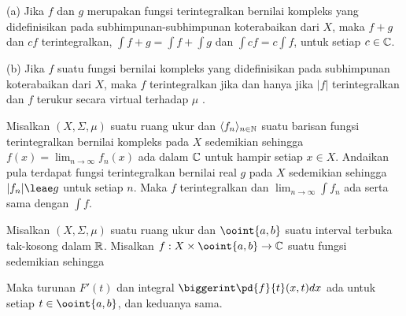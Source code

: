 (a) Jika $f$ dan $g$ merupakan fungsi terintegralkan bernilai kompleks yang
didefinisikan pada subhimpunan-subhimpunan koterabaikan dari $X$, maka $f+g$
dan $cf$ terintegralkan, $\int f+g=\int f+\int g$ dan
$\int cf=c\int f$, untuk setiap $c\in\Bbb C$.

{(b)} Jika $f$ suatu fungsi bernilai kompleks yang didefinisikan pada
subhimpunan koterabaikan dari $X$, maka $f$ terintegralkan jika dan hanya jika
$|f|$ terintegralkan dan $f$ terukur secara virtual terhadap $\mu$
.


 Misalkan
$(X,\Sigma,\mu)$ suatu ruang ukur dan $\langle f_n\rangle_{n\in\Bbb N}$ suatu
barisan fungsi terintegralkan bernilai kompleks pada $X$ sedemikian sehingga
$f(x)=\lim_{n\to\infty}f_n(x)$ ada dalam $\Bbb C$ untuk hampir setiap
$x\in X$. Andaikan pula terdapat fungsi terintegralkan bernilai real $g$
pada $X$ sedemikian sehingga $|f_n|\leae g$ untuk setiap $n$. Maka $f$
terintegralkan dan $\lim_{n\to\infty}\int f_n$ ada serta sama dengan
$\int f$.


 Misalkan $(X,\Sigma,\mu)$ suatu ruang ukur dan
$\ooint{a,b}$ suatu interval terbuka tak-kosong dalam $\Bbb R$. Misalkan
$f:X\times\ooint{a,b}\to\Bbb C$ suatu fungsi sedemikian sehingga




\noindent Maka turunan $F'(t)$ dan integral
$\biggerint\pd{f}{t}(x,t)dx$ ada untuk setiap $t\in\ooint{a,b}$, dan
keduanya sama.

